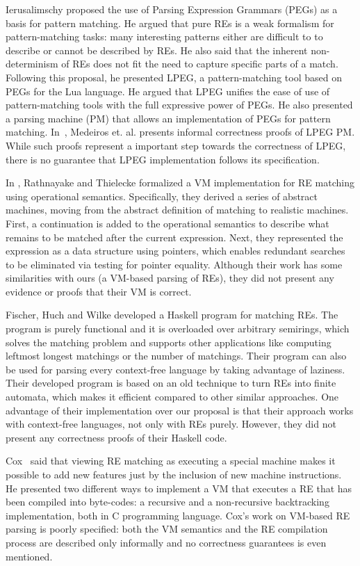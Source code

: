 \documentclass[sigplan]{acmart}
\theoremstyle{definition}
\begin{document}
Ierusalimschy \cite{Ierusalimschy2009} proposed the use of Parsing Expression Grammars (PEGs) as a basis
for pattern matching. He argued that pure REs is a weak formalism for pattern-matching tasks:
many interesting patterns either are difficult to to describe or cannot be described by REs. He also said
that the inherent non-determinism of REs does not fit the need to capture specific parts of a match. Following
this proposal, he presented LPEG, a pattern-matching tool based on PEGs for the Lua language. He
argued that LPEG unifies the ease of use of pattern-matching tools with the full expressive power of PEGs.
He also presented a parsing machine (PM) that allows an implementation of PEGs for pattern matching.
In~\cite{Medeiros2008}, Medeiros et. al. presents informal correctness proofs of LPEG PM.
While such proofs represent a important step towards the correctness of LPEG, there is no guarantee that LPEG
implementation follows its specification.

In \cite{Rathnayake2011}, Rathnayake and Thielecke formalized a VM implementation for RE matching using
operational semantics. Specifically, they derived a series of abstract machines, moving from the abstract
definition of matching to realistic machines. First, a continuation is added to the operational semantics
to describe what remains to be matched after the current expression. Next, they represented the expression
as a data structure using pointers, which enables redundant searches to be eliminated via testing for pointer
equality. Although their work has some similarities with ours (a VM-based parsing of REs), they did not present
any evidence or proofs that their VM is correct.

Fischer, Huch and Wilke \cite{Fischer2010} developed a Haskell program for matching REs. The program is purely
functional and it is overloaded over arbitrary semirings, which solves the matching problem and supports other
applications like computing leftmost longest matchings or the number of matchings. Their program can also be used
for parsing every context-free language by taking advantage of laziness. Their developed program is based on an
old technique to turn REs into finite automata, which makes it efficient compared to other similar approaches.
One advantage of their implementation over our proposal is that their approach works with context-free languages,
not only with REs purely. However, they did not present any correctness proofs of their Haskell code.

Cox~\cite{Cox2009} said that viewing RE matching as executing a special machine makes it possible to add new
features just by the inclusion of new machine instructions. He presented two different ways to implement
a VM that executes a RE that has been compiled into  byte-codes: a recursive and a non-recursive
backtracking implementation, both in C programming language. Cox's work on VM-based RE parsing is poorly specified:
both the VM semantics and the RE compilation process are described only informally
and no correctness guarantees is even mentioned.
\end{document}

